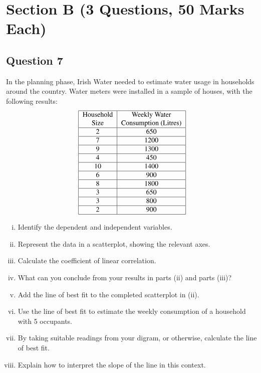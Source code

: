 \documentclass[12pt]{article}
\begin{document}
\newpage

\section*{Section B (3 Questions, 50 Marks Each)}
\subsection*{Question 7}
In the planning phase, Irish Water needed to estimate water usage in households around the country.
Water meters were installed in a sample of houses, with the following results:
{\small
\[
\begin{tabular}{|c|c|}
	\hline 
	Household  & Weekly Water \\ 

	Size & Consumption (Litres) \\ 
	\hline 
	2 & 650 \\ 
	\hline 
	7 & 1200 \\ 
	\hline 
	9 & 1300 \\ 
	\hline 
	4 & 450 \\ 
	\hline 
	10 & 1400 \\ 
	\hline 
	6 & 900 \\ 
	\hline 
	8 & 1800 \\ 
	\hline 
	3 & 650 \\ 
	\hline 
	3 & 800 \\ 
	\hline 
	2 & 900 \\ 
	\hline 
\end{tabular} 
\]
}
\begin{enumerate}[(i)]
	\item Identify the dependent and independent variables.
	
	\item Represent the data in a scatterplot, showing the relevant axes.
	
	\item Calculate the coefficient of linear correlation.
	\item What can you conclude from your results in parts (ii) and parts (iii)?
        \item Add the line of best fit to the completed scatterplot in (ii).
    \item Use the line of best fit to estimate the weekly consumption of a household with 5 occupants.    
	\item By taking suitable readings from your digram, or otherwise, calculate the line of best fit.
\item Explain how to interpret the slope of the line in this context.
\end{enumerate}
\end{document}
